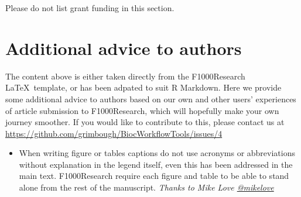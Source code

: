 \documentclass[9pt,a4paper,]{extarticle}
\begin{document}
Please do not list grant funding in this section.

\hypertarget{additional-advice-to-authors}{%
\section{Additional advice to authors}\label{additional-advice-to-authors}}

The content above is either taken directly from the F1000Research \LaTeX~template, or has been adpated to suit R Markdown. Here we provide some additional advice to authors based on our own and other users' experiences of article submission to F1000Research, which will hopefully make your own journey smoother. If you would like to contribute to this, please contact us at \url{https://github.com/grimbough/BiocWorkflowTools/issues/4}

\begin{itemize}
\item
  When writing figure or tables captions do not use acronyms or abbreviations without explanation in the legend itself, even this has been addressed in the main text. F1000Research require each figure and table to be able to stand alone from the rest of the manuscript. \emph{Thanks to Mike Love \href{https://twitter.com/mikelove}{@mikelove}}
\end{itemize}


\end{document}

